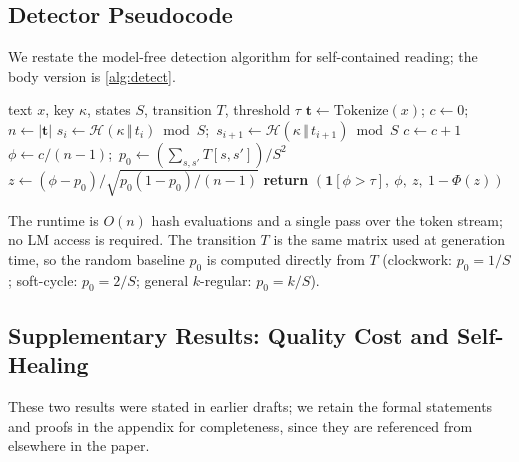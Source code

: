 
\subsection{Detector Pseudocode}
\label{subsec:detector-pseudo}

We restate the model-free detection algorithm for self-contained
reading; the body version is \autoref{alg:detect}.

\begin{algorithm}[h]
  \caption{ChainMark Watermark Detection (model-free)}
  \label{alg:detect-app}
  \begin{algorithmic}
     text $x$, key $\kappa$, states $S$,
      transition $T$, threshold $\tau$
    \STATE $\mathbf{t} \leftarrow \mathrm{Tokenize}(x)$;
      $c \leftarrow 0$;\ $n \leftarrow |\mathbf{t}|$
      \STATE $s_i \leftarrow \mathcal{H}(\kappa \,\Vert\, t_i) \bmod S$;\
        $s_{i+1} \leftarrow \mathcal{H}(\kappa \,\Vert\, t_{i+1}) \bmod S$
      \IF{$T[s_i, s_{i+1}] > 0$}
        \STATE $c \leftarrow c + 1$
      \ENDIF
    \ENDFOR
    \STATE $\phi \leftarrow c / (n-1)$;\
      $p_0 \leftarrow (\sum_{s,s'} T[s,s']) / S^2$
    \STATE $z \leftarrow (\phi - p_0)
      / \sqrt{p_0 (1 - p_0) / (n-1)}$
    \STATE \textbf{return} $(\mathbf{1}[\phi > \tau],\ \phi,\ z,\
      1 - \Phi(z))$
  \end{algorithmic}
\end{algorithm}

The runtime is $O(n)$ hash evaluations and a single pass over the
token stream; no LM access is required.  The transition $T$ is the
same matrix used at generation time, so the random baseline $p_0$
is computed directly from $T$ (clockwork: $p_0 = 1/S$;
soft-cycle: $p_0 = 2/S$; general $k$-regular: $p_0 = k/S$).

\subsection{Supplementary Results: Quality Cost and Self-Healing}
\label{subsec:proof-supplementary}

These two results were stated in earlier drafts; we retain the
formal statements and proofs in the appendix for completeness, since
they are referenced from elsewhere in the paper.

